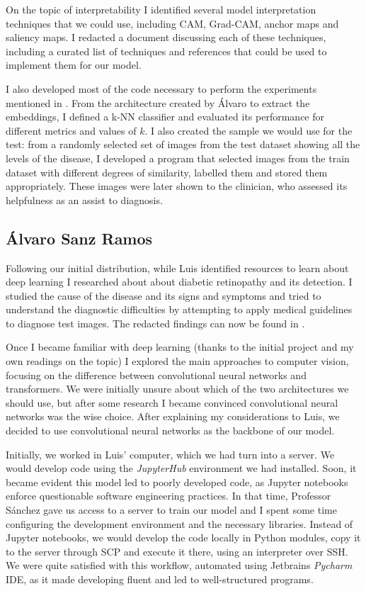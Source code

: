 On the topic of interpretability I identified several model interpretation techniques that we could use, including CAM, Grad-CAM, anchor maps and saliency maps. I redacted a document discussing each of these techniques, including a curated list of techniques and references that could be used to implement them for our model.

I also developed most of the code necessary to perform the experiments mentioned in . From the architecture created by Álvaro to extract the embeddings, I defined a k-NN classifier and evaluated its performance for different metrics and values of $k$. I also created the sample we would use for the test: from a randomly selected set of images from the test dataset showing all the levels of the disease, I developed a program that selected images from the train dataset with different degrees of similarity, labelled them and stored them appropriately. These images were later shown to the clinician, who assessed its helpfulness as an assist to diagnosis.


\subsection*{Álvaro Sanz Ramos}
Following our initial distribution, while Luis identified resources to learn about deep learning I researched about about diabetic retinopathy and its detection. I studied the cause of the disease and its signs and symptoms and tried to understand the diagnostic difficulties by attempting to apply medical guidelines to diagnose test images. The redacted findings can now be found in .

Once I became familiar with deep learning (thanks to the initial project and my own readings on the topic) I explored the main approaches to computer vision, focusing on the difference between convolutional neural networks and transformers. We were initially unsure about which of the two architectures we should use, but after some research I became convinced convolutional neural networks was the wise choice. After explaining my considerations to Luis, we decided to use convolutional neural networks as the backbone of our model.

Initially, we worked in Luis' computer, which we had turn into a server. We would develop code using the \textit{JupyterHub} environment we had installed. Soon, it became evident this model led to poorly developed code, as Jupyter notebooks enforce questionable software engineering practices. In that time, Professor Sánchez gave us access to a server to train our model and I spent some time configuring the development environment and the necessary libraries. Instead of Jupyter notebooks, we would develop the code locally in Python modules, copy it to the server through SCP and execute it there, using an interpreter over SSH. We were quite satisfied with this workflow, automated using Jetbrains \textit{Pycharm} IDE, as it made developing fluent and led to well-structured programs.

